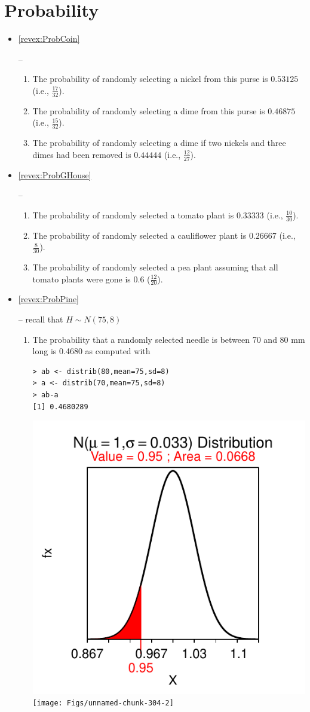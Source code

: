 \documentclass[10pt,openany]{book}\usepackage[]{graphicx}\usepackage[]{color}
\makeatletter
\newenvironment{kframe}{%
 \def\at@end@of@kframe{}%
 \ifinner\ifhmode%
  \def\at@end@of@kframe{\end{minipage}}%
  \begin{minipage}{\columnwidth}%
 \fi\fi%
 \def\FrameCommand##1{\hskip\@totalleftmargin \hskip-\fboxsep
 \colorbox{shadecolor}{##1}\hskip-\fboxsep
     \hskip-\linewidth \hskip-\@totalleftmargin \hskip\columnwidth}%
 \MakeFramed {\advance\hsize-\width
   \@totalleftmargin\z@ \linewidth\hsize
   \@setminipage}}%
 {\par\unskip\endMakeFramed%
 \at@end@of@kframe}
\newenvironment{knitrout}{}{} %
\makeatother
\begin{document}
\section*{Probability}
\begin{itemize}
  \item \hypertarget{ans:ProbCoin}{\ref{revex:ProbCoin}} --
  \begin{enumerate}
    \item The probability of randomly selecting a nickel from this purse is $0.53125$ (i.e., $\frac{17}{32}$).
    \item The probability of randomly selecting a dime from this purse is $0.46875$ (i.e., $\frac{15}{32}$).
    \item The probability of randomly selecting a dime if two nickels and three dimes had been removed is $0.44444$ (i.e., $\frac{12}{27}$).
  \end{enumerate}

  \item \hypertarget{ans:ProbGHouse}{\ref{revex:ProbGHouse}} --
  \begin{enumerate}
    \item The probability of randomly selected a tomato plant is $0.33333$ (i.e., $\frac{10}{30}$).
    \item The probability of randomly selected a cauliflower plant is $0.26667$ (i.e., $\frac{8}{30}$).
    \item The probability of randomly selected a pea plant assuming that all tomato plants were gone is $0.6$ ($\frac{12}{20}$).
  \end{enumerate}

  \item \hypertarget{ans:ProbPine}{\ref{revex:ProbPine}} -- recall that $H\sim N(75,8)$
  \begin{enumerate}
    \item The probability that a randomly selected needle is between 70 and 80 mm long is 0.4680 as computed with
\begin{knitrout}
\color{fgcolor}\begin{kframe}
\begin{verbatim}
> ab <- distrib(80,mean=75,sd=8)
> a <- distrib(70,mean=75,sd=8)
> ab-a
[1] 0.4680289
\end{verbatim}
\end{kframe}

{\centering \includegraphics[width=.4\linewidth]{Figs/unnamed-chunk-304-1} 
\texttt{[image: Figs/unnamed-chunk-304-2]} 

}
\end{knitrout}
\end{enumerate}
\end{itemize}
\end{document}
